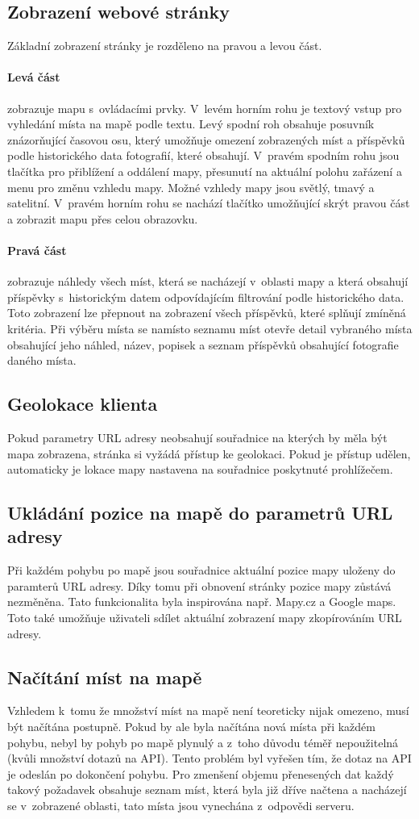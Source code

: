 \documentclass[12pt, a4paper,
  oneside,      %
]{report}
\begin{document}
\subsection{Zobrazení webové stránky}
Základní zobrazení stránky je rozděleno na pravou a levou část.
\paragraph{Levá část} zobrazuje mapu s~ovládacími prvky. V~levém horním rohu je textový vstup pro vyhledání místa na mapě podle textu. Levý spodní roh obsahuje posuvník znázorňující časovou osu, který umožňuje omezení zobrazených míst a příspěvků podle historického data fotografií, které obsahují. V~pravém spodním rohu jsou tlačítka pro přiblížení a oddálení mapy, přesunutí na aktuální polohu zařázení a menu pro změnu vzhledu mapy. Možné vzhledy mapy jsou světlý, tmavý a satelitní. V~pravém horním rohu se nachází tlačítko umožňující skrýt pravou část a zobrazit mapu přes celou obrazovku.
\paragraph{Pravá část} zobrazuje náhledy všech míst, která se nacházejí v~oblasti mapy a která obsahují příspěvky s~historickým datem odpovídajícím filtrování podle historického data. Toto zobrazení lze přepnout na zobrazení všech příspěvků, které splňují zmíněná kritéria. Při výběru místa se namísto seznamu míst otevře detail vybraného místa obsahující jeho náhled, název, popisek a seznam příspěvků obsahující fotografie daného místa.
\subsection{Geolokace klienta} Pokud parametry URL adresy neobsahují souřadnice na kterých by měla být mapa zobrazena, stránka si vyžádá přístup ke geolokaci. Pokud je přístup udělen, automaticky je lokace mapy nastavena na souřadnice poskytnuté prohlížečem.
\subsection{Ukládání pozice na mapě do parametrů URL adresy}
Při každém pohybu po mapě jsou souřadnice aktuální pozice mapy uloženy do paramterů URL adresy. Díky tomu při obnovení stránky pozice mapy zůstává nezměněna. Tato funkcionalita byla inspirována např. Mapy.cz a Google maps. Toto také umožňuje uživateli sdílet aktuální zobrazení mapy zkopírováním URL adresy.
\subsection{Načítání míst na mapě}
Vzhledem k~tomu že množství míst na mapě není teoreticky nijak omezeno, musí být načítána postupně. Pokud by ale byla načítána nová místa při každém pohybu, nebyl by pohyb po mapě plynulý a z~toho důvodu téměř nepoužitelná (kvůli množství dotazů na API). Tento problém byl vyřešen tím, že dotaz na API je odeslán po dokončení pohybu. Pro zmenšení objemu přenesených dat každý takový požadavek obsahuje seznam míst, která byla již dříve načtena a nacházejí se v~zobrazené oblasti, tato místa jsou vynechána z~odpovědi serveru.
\clearpage
\end{document}
